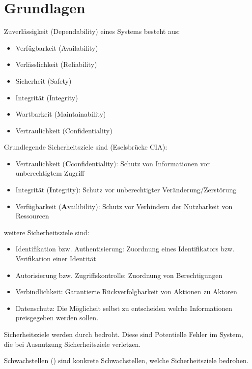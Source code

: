 \chapter{Grundlagen}
Zuverlässigkeit (Dependability) eines Systems besteht aus:
\begin{itemize}
    \item Verfügbarkeit (Availability)
    \item Verlässlichkeit (Reliability)
    \item Sicherheit (Safety)
    \item Integrität (Integrity)
    \item Wartbarkeit (Maintainability)
    \item Vertraulichkeit (Confidentiality)
\end{itemize}

Grundlegende Sicherheitsziele sind (Eselsbrücke CIA):
\begin{itemize}
    \item Vertraulichkeit (\textbf{C}confidentiality):
        Schutz von Informationen vor unberechtigtem Zugriff
    \item Integrität (\textbf{I}ntegrity):
        Schutz vor unberechtigter Veränderung/Zerstörung
    \item Verfügbarkeit (\textbf{A}vailibility):
        Schutz vor Verhindern der Nutzbarkeit von Ressourcen
\end{itemize}
weitere Sicherheitsziele sind:
\begin{itemize}
    \item Identifikation bzw. Authentisierung:
        Zuordnung eines Identifikators bzw. Verifikation einer Identität
    \item Autorisierung bzw. Zugriffskontrolle:
        Zuordnung von Berechtigungen
    \item Verbindlichkeit:
        Garantierte Rückverfolgbarkeit von Aktionen zu Aktoren
    \item Datenschutz:
        Die Möglicheit selbst zu entscheiden welche Informationen preisgegeben werden sollen.
\end{itemize}

Sicherheitsziele werden durch  bedroht. 
Diese sind Potentielle Fehler im System, die bei Ausnutzung Sicherheitsziele verletzen.

\vspace{0.3cm}

Schwachstellen () sind konkrete Schwachstellen, welche Sicherheitsziele bedrohen.

